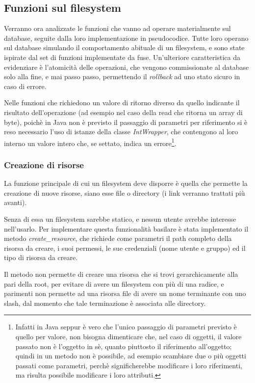 \newpage

\subsection{Funzioni sul filesystem}
Verranno ora analizzate le funzioni che vanno ad operare materialmente sul database, seguite dalla loro implementazione in pseudocodice. Tutte loro operano sul database simulando il comportamento abituale di un filesystem, e sono state ispirate dal set di funzioni implementate da fuse. Un'ulteriore caratteristica da evidenziare è l'atomicità delle operazioni, che vengono commissionate al database solo alla fine, e mai passo passo, permettendo il \emph{rollback} ad uno stato sicuro in caso di errore.

Nelle funzioni che richiedono un valore di ritorno diverso da quello indicante il risultato dell'operazione (ad esempio nel caso della read che ritorna un array di byte), poichè in Java non è previsto il passaggio di parametri per riferimento si è reso necessario l'uso di istanze della classe \emph{IntWrapper}, che contengono al loro interno un valore intero che, se settato, indica un errore\footnote{Infatti in Java seppur è vero che l'unico passaggio di parametri previsto è quello per valore, non bisogna dimenticare che, nel caso di oggetti, il valore passato non è l'oggetto in sè, quanto piuttosto il riferimento all'oggetto; quindi in un metodo non è possibile, ad esempio scambiare due o più oggetti passati come parametri, perchè significherebbe modificare i loro riferimenti, ma risulta possibile modificare i loro attributi.}.

\subsubsection{Creazione di risorse}
La funzione principale di cui un filesystem deve disporre è quella che permette la creazione di nuove risorse, siano esse file o directory (i link verranno trattati più avanti). 

Senza di essa un filesystem sarebbe statico, e nessun utente avrebbe interesse nell'usarlo. Per implementare questa funzionalità basilare è stata implementato il metodo \emph{create\_resource}, che richiede come parametri il path completo della risorsa da creare, i suoi permessi, le sue credenziali (nome utente e gruppo) ed il tipo di risorsa da creare.

Il metodo non permette di creare una risorsa che si trovi gerarchicamente alla pari della root, per evitare di avere un filesystem con più di una radice, e parimenti non permette ad una risorsa file di avere un nome terminante con uno slash, dal momento che tale terminazione è associata alle directory.

